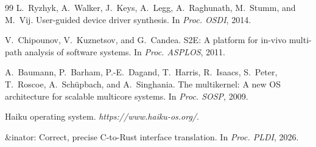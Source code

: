 \documentclass[sigplan, screen, review, anonymous]{acmart}
\begin{document}
\begin{thebibliography}{99}
L.~Ryzhyk, A.~Walker, J.~Keys, A.~Legg, A.~Raghunath, M.~Stumm, and M.~Vij.
\newblock User-guided device driver synthesis.
\newblock In \emph{Proc. OSDI}, 2014.

V.~Chipounov, V.~Kuznetsov, and G.~Candea.
\newblock S2E: A platform for in-vivo multi-path analysis of software systems.
\newblock In \emph{Proc. ASPLOS}, 2011.

A.~Baumann, P.~Barham, P.-E.~Dagand, T.~Harris, R.~Isaacs, S.~Peter, T.~Roscoe, A.~Schüpbach, and A.~Singhania.
\newblock The multikernel: A new OS architecture for scalable multicore systems.
\newblock In \emph{Proc. SOSP}, 2009.

\newblock Haiku operating system.
\newblock \emph{https://www.haiku-os.org/}.

\newblock \&inator: Correct, precise C-to-Rust interface translation.
\newblock In \emph{Proc. PLDI}, 2026.

\end{thebibliography}
\end{document}
